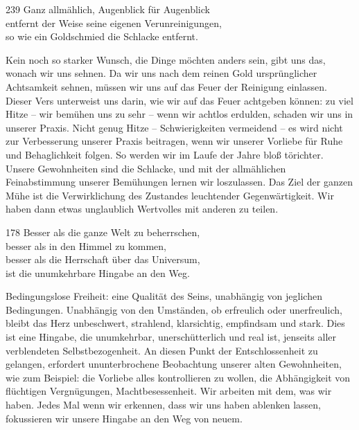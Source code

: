
\begin{dhpVerse}{239}
\label{dhp-239}
Ganz allmählich, Augenblick für Augenblick\\ 
entfernt der Weise seine eigenen Verunreinigungen,\\ 
so wie ein Goldschmied die Schlacke entfernt. 
\end{dhpVerse}

\begin{dhpRefl}

Kein noch so starker Wunsch, die Dinge möchten anders sein, gibt uns das,
wonach wir uns sehnen. Da wir uns nach dem reinen Gold ursprünglicher
Achtsamkeit sehnen, müssen wir uns auf das Feuer der Reinigung einlassen.
Dieser Vers unterweist uns darin, wie wir auf das Feuer achtgeben können: zu
viel Hitze -- wir bemühen uns zu sehr -- wenn wir achtlos erdulden, schaden
wir uns in unserer Praxis. Nicht genug Hitze -- Schwierigkeiten vermeidend --
es wird nicht zur Verbesserung unserer Praxis beitragen, wenn wir unserer
Vorliebe für Ruhe und Behaglichkeit folgen. So werden wir im Laufe der Jahre
bloß törichter. Unsere Gewohnheiten sind die Schlacke, und mit der
allmählichen Feinabstimmung unserer Bemühungen lernen wir loszulassen. Das
Ziel der ganzen Mühe ist die Verwirklichung des Zustandes leuchtender
Gegenwärtigkeit. Wir haben dann etwas unglaublich Wertvolles mit anderen zu
teilen.

\end{dhpRefl}


\begin{dhpVerse}{178}
\label{dhp-178}
Besser als die ganze Welt zu beherrschen,\\ 
besser als in den Himmel zu kommen,\\ 
besser als die Herrschaft über das Universum,\\ 
ist die unumkehrbare Hingabe an den Weg. 
\end{dhpVerse}

\begin{dhpRefl}

Bedingungslose Freiheit: eine Qualität des Seins, unabhängig von
jeglichen Bedingungen. Unabhängig von den Umständen, ob erfreulich oder
unerfreulich, bleibt das Herz unbeschwert, strahlend, klarsichtig, empfindsam
und stark. Dies ist eine Hingabe, die unumkehrbar, unerschütterlich und real
ist, jenseits aller verblendeten Selbstbezogenheit. An diesen Punkt der
Entschlossenheit zu gelangen, erfordert ununterbrochene Beobachtung unserer
alten Gewohnheiten, wie zum Beispiel: die Vorliebe alles kontrollieren zu
wollen, die Abhängigkeit von flüchtigen Vergnügungen, Machtbesessenheit. Wir
arbeiten mit dem, was wir haben. Jedes Mal wenn wir erkennen, dass wir uns
haben ablenken lassen, fokussieren wir unsere Hingabe an den Weg von neuem.

\end{dhpRefl}

